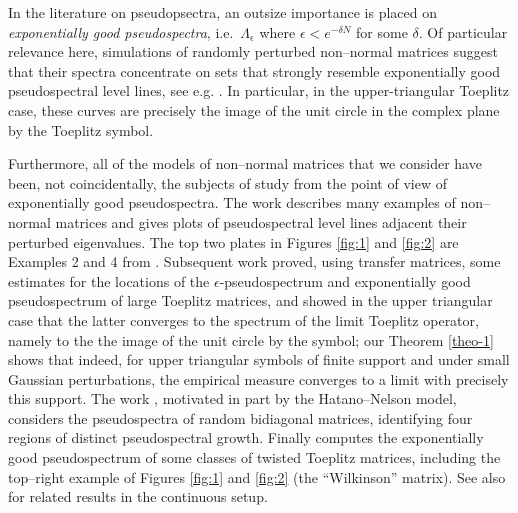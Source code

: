 \documentclass{amsart}
\numberwithin{equation}{section}
\begin{document}
  In the literature on pseudopsectra, an outsize importance is placed on \emph{exponentially good pseudospectra}, i.e.\ $\Lambda_\epsilon$ where $\epsilon < e^{-\delta N}$ for some $\delta.$  Of particular relevance here, simulations of randomly perturbed non--normal matrices suggest that their spectra concentrate on sets that strongly resemble exponentially good pseudospectral level lines,
  see e.g. \cite{TrefethenReichel}. In particular, in the upper-triangular
 Toeplitz case, these curves
 are precisely the image of the unit circle in the complex
 plane by the Toeplitz symbol.

  Furthermore, all of the models of non--normal matrices that we consider have been, not coincidentally, the subjects of study from the point of view of exponentially good pseudospectra.
  The work \cite{Trefethen1991} describes many examples of non--normal matrices and gives plots of pseudospectral level lines adjacent their perturbed eigenvalues.   The top two plates in Figures \ref{fig:1} and \ref{fig:2} are Examples 2 and 4 from \cite{Trefethen1991}.  Subsequent work \cite{TrefethenReichel} proved, using transfer matrices, some estimates for the locations of the $\epsilon$-pseudospectrum and exponentially good pseudospectrum 
of large Toeplitz matrices, and showed in the upper triangular case  that the latter converges to the spectrum of the limit Toeplitz operator, namely to the the image of the unit circle by the symbol; our Theorem 
\ref{theo-1}
 shows that indeed, for upper triangular symbols of finite support and under small Gaussian perturbations, the empirical measure converges to a limit with precisely this support.  The work \cite{TrefethenContediniEmbree}, motivated in part by the Hatano--Nelson model, considers the pseudospectra of random bidiagonal matrices, identifying four regions of distinct pseudospectral growth.   Finally \cite{TrefethenChapman} computes the exponentially good pseudospectrum of some classes of twisted Toeplitz matrices, including the top--right example of Figures \ref{fig:1} and \ref{fig:2} (the ``Wilkinson'' matrix). See also 
\cite{Trefcont} for related results in the continuous setup.
\end{document}
